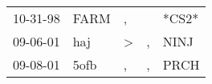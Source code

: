 \begin{supertabular}{lllll}
 10-31-98 &  FARM &             , &    &  *CS2* \\
 09-06-01 &   haj &  \textgreater &  , &   NINJ \\
 09-08-01 &  5ofb &             , &  , &   PRCH \\
\end{supertabular}
